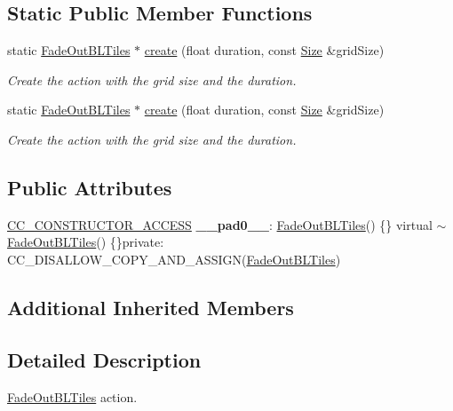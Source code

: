 \subsection*{Static Public Member Functions}
\begin{DoxyCompactItemize}
\item 
static \hyperlink{classFadeOutBLTiles}{Fade\+Out\+B\+L\+Tiles} $\ast$ \hyperlink{classFadeOutBLTiles_a825e625fa5bd1dc894d1870ef503e011}{create} (float duration, const \hyperlink{classSize}{Size} \&grid\+Size)
\begin{DoxyCompactList}\small\item\em Create the action with the grid size and the duration. \end{DoxyCompactList}\item 
static \hyperlink{classFadeOutBLTiles}{Fade\+Out\+B\+L\+Tiles} $\ast$ \hyperlink{classFadeOutBLTiles_a648befb760bc2561a041a51b1b436264}{create} (float duration, const \hyperlink{classSize}{Size} \&grid\+Size)
\begin{DoxyCompactList}\small\item\em Create the action with the grid size and the duration. \end{DoxyCompactList}\end{DoxyCompactItemize}
\subsection*{Public Attributes}
\begin{DoxyCompactItemize}
\item 
\mbox{\label{classFadeOutBLTiles_a32d4af4a0e22cccea0c3515e73f2a70b}} 
\hyperlink{_2cocos2d_2cocos_2base_2ccConfig_8h_a25ef1314f97c35a2ed3d029b0ead6da0}{C\+C\+\_\+\+C\+O\+N\+S\+T\+R\+U\+C\+T\+O\+R\+\_\+\+A\+C\+C\+E\+SS} {\bfseries \+\_\+\+\_\+pad0\+\_\+\+\_\+}\+: \hyperlink{classFadeOutBLTiles}{Fade\+Out\+B\+L\+Tiles}() \{\} virtual $\sim$\hyperlink{classFadeOutBLTiles}{Fade\+Out\+B\+L\+Tiles}() \{\}private\+: C\+C\+\_\+\+D\+I\+S\+A\+L\+L\+O\+W\+\_\+\+C\+O\+P\+Y\+\_\+\+A\+N\+D\+\_\+\+A\+S\+S\+I\+GN(\hyperlink{classFadeOutBLTiles}{Fade\+Out\+B\+L\+Tiles})
\end{DoxyCompactItemize}
\subsection*{Additional Inherited Members}


\subsection{Detailed Description}
\hyperlink{classFadeOutBLTiles}{Fade\+Out\+B\+L\+Tiles} action. 

